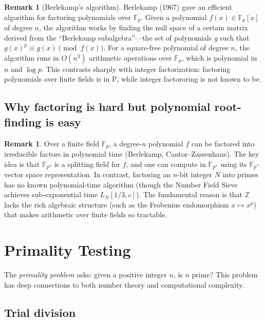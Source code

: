 \documentclass[twoside,12pt]{book}
\theoremstyle{plain}
\theoremstyle{definition}
\newtheorem{remark}[theorem]{Remark}
\theoremstyle{remark}
\begin{document}
\begin{remark}[Berlekamp's algorithm]
Berlekamp (1967) gave an efficient algorithm for factoring polynomials over $\mathbb{F}_p$. Given a polynomial $f(x) \in \mathbb{F}_p[x]$ of degree $n$, the algorithm works by finding the null space of a certain matrix derived from the ``Berlekamp subalgebra''---the set of polynomials $g$ such that $g(x)^p \equiv g(x) \pmod{f(x)}$. For a square-free polynomial of degree $n$, the algorithm runs in $O(n^3)$ arithmetic operations over $\mathbb{F}_p$, which is polynomial in $n$ and $\log p$. This contrasts sharply with integer factorization: factoring polynomials over finite fields is in $\text{P}$, while integer factororing is not known to be.
\end{remark}

\subsection{Why factoring is hard but polynomial root-finding is easy}

\begin{remark}
Over a finite field $\mathbb{F}_p$, a degree-$n$ polynomial $f$ can be factored into irreducible factors in polynomial time (Berlekamp, Cantor--Zassenhaus). The key idea is that $\mathbb{F}_{p^n}$ is a splitting field for $f$, and one can compute in $\mathbb{F}_{p^n}$ using its $\mathbb{F}_p$-vector space representation. In contrast, factoring an $n$-bit integer $N$ into primes has no known polynomial-time algorithm (though the Number Field Sieve achieves sub-exponential time $L_N[1/3, c]$). The fundamental reason is that $\mathbb{Z}$ lacks the rich algebraic structure (such as the Frobenius endomorphism $x \mapsto x^p$) that makes arithmetic over finite fields so tractable.
\end{remark}

\section{Primality Testing}
\label{sec:primality}

The \emph{primality problem} asks: given a positive integer $n$, is $n$ prime? This problem has deep connections to both number theory and computational complexity.

\subsection{Trial division}
\end{document}
